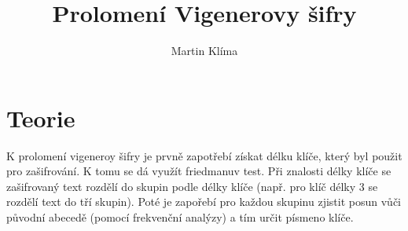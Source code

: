 \documentclass{article}
\title{Prolomení Vigenerovy šifry}
\author{Martin Klíma}
\begin{document}
\maketitle

\section{Teorie}
K prolomení vigeneroy šifry je prvně zapotřebí získat délku klíče, který byl použit pro zašifrování. K tomu se dá využít friedmanuv test. Při znalosti délky klíče se zašifrovaný text rozdělí do skupin podle délky klíče (např. pro klíč délky 3 se rozdělí text do tří skupin). Poté je zapořebí pro každou skupinu zjistit posun vůči původní abecedě (pomocí frekvenční analýzy) a tím určit písmeno klíče. 
\end{document}
